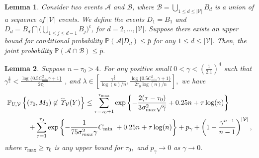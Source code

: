 \documentclass[10pt,a4paper]{amsart}
\newtheorem{lemma}{Lemma}
\def\P{\mathbb P}
\begin{document}
\begin{lemma}
\label{lem: upper_coniditonal}
    Consider two events $\mathcal A$ and $\mathcal B$, where $\mathcal B = \bigcup_{1 \leq d \leq |{\mathcal V}|} B_d$ is a union of a sequence of $|{\mathcal V}|$ events. 
    We define the events $D_1 = B_1$ and $D_d = B_d \bigcap\big(\bigcup_{1\leq j \leq d-1} B_j\big)^c
    $, for $d = 2, \ldots, |{\mathcal V}|.$
    Suppose there exists an upper bound for conditional probability $\P(\mathcal A | D_d) \leq \bar p$ for any $1 \leq d \leq |{\mathcal V}|$. Then, the joint probability $\P(\mathcal A \cap \mathcal B) \leq \bar p.$ 
\end{lemma}

\begin{lemma}
\label{lem:bound_single_ustar}
Suppose $n-\tau_0>4$. For any positive small $0 < \gamma < (\frac{1}{2.1})^4$ such that 
$\gamma^{\frac 32} < \frac{\log\{0.5C^2_{\min}\gamma + 1\}}{2 \tau_0 } $ , and $\lambda \in [\frac{\gamma^{\frac32}}{\log(n)/n},\frac{\log\{0.5C^2_{\min}\gamma + 1\}}{2 \tau_0 \log(n)/n}],$ we have 
\begin{align}
\label{eq:prob_bound_C_D_simple-1}
      &  \P_{\*U,\mathcal V  }\left\{(\tau_0, \*M_0) \not\in \widehat{\it \Upsilon}_{{\mathcal V}}(\*Y)\right\} 
       \leq \sum^{\tau_{\max}}_{\tau=\tau_0+1}
    \exp\left\{-\frac{2(\tau-\tau_0)}{3\sigma^2_{\max}\sqrt{\gamma}}    + 0.25n +  \tau\log(n) \right\} \nonumber \\
    & \quad \qquad  +  \sum_{\tau=1}^{\tau_0} \exp\left\{-\frac{1}{75\sigma^2_{max}\gamma} C_{\min}\ + 0.25n + \tau\log(n)\right\}
     + p_\gamma + \left(1-\frac{\gamma^{n-1}}{n-1}\right)^{|{\mathcal V}|},
\end{align}
where $\tau_{\max} \geq \tau_0$ is any upper bound for $\tau_0,$ and $p_\gamma \rightarrow 0$ as $\gamma \rightarrow 0.$ 
\end{lemma}
\end{document}
